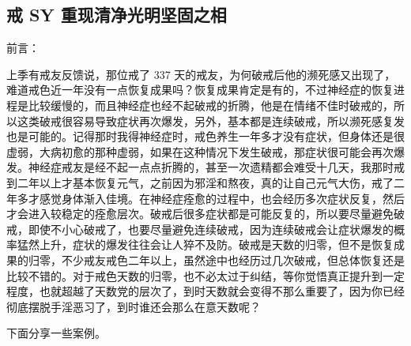 \subsection{戒 SY 重现清净光明坚固之相}

前言：

上季有戒友反馈说，那位戒了 337 天的戒友，为何破戒后他的濒死感又出现了，难道戒色近一年没有一点恢复成果吗？恢复成果肯定是有的，不过神经症的恢复进程是比较缓慢的，而且神经症也经不起破戒的折腾，他是在情绪不佳时破戒的，所以这类破戒很容易导致症状再次爆发，另外，基本都是连续破戒，所以濒死感复发也是可能的。记得那时我得神经症时，戒色养生一年多才没有症状，但身体还是很虚弱，大病初愈的那种虚弱，如果在这种情况下发生破戒，那症状很可能会再次爆发。神经症戒友是经不起一点点折腾的，甚至一次遗精都会难受十几天，我那时戒到二年以上才基本恢复元气，之前因为邪淫和熬夜，真的让自己元气大伤，戒了二年多才感觉身体渐入佳境。在神经症痊愈的过程中，也会经历多次症状反复，然后才会进入较稳定的痊愈层次。破戒后很多症状都是可能反复的，所以要尽量避免破戒，即使不小心破戒了，也要尽量避免连续破戒，因为连续破戒会让症状爆发的概率猛然上升，症状的爆发往往会让人猝不及防。破戒是天数的归零，但不是恢复成果的归零，不少戒友戒色二年以上，虽然途中也经历过几次破戒，但总体恢复还是比较不错的。对于戒色天数的归零，也不必太过于纠结，等你觉悟真正提升到一定程度，也就超越了天数党的层次了，到时天数就会变得不那么重要了，因为你已经彻底摆脱手淫恶习了，到时谁还会那么在意天数呢？

下面分享一些案例。

